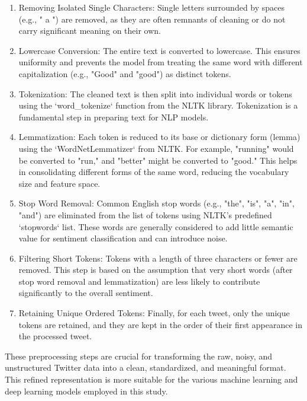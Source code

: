 \begin{enumerate}
    \item Removing Isolated Single Characters: Single letters surrounded by spaces (e.g., " a ") are removed, as they are often remnants of cleaning or do not carry significant meaning on their own.
    \item Lowercase Conversion: The entire text is converted to lowercase. This ensures uniformity and prevents the model from treating the same word with different capitalization (e.g., "Good" and "good") as distinct tokens.
    \item Tokenization: The cleaned text is then split into individual words or tokens using the `word\_tokenize` function from the NLTK library. Tokenization is a fundamental step in preparing text for NLP models.
    \item Lemmatization: Each token is reduced to its base or dictionary form (lemma) using the `WordNetLemmatizer` from NLTK. For example, "running" would be converted to "run," and "better" might be converted to "good." This helps in consolidating different forms of the same word, reducing the vocabulary size and feature space.
    \item Stop Word Removal: Common English stop words (e.g., "the", "is", "a", "in", "and") are eliminated from the list of tokens using NLTK's predefined `stopwords` list. These words are generally considered to add little semantic value for sentiment classification and can introduce noise.
    \item Filtering Short Tokens: Tokens with a length of three characters or fewer are removed. This step is based on the assumption that very short words (after stop word removal and lemmatization) are less likely to contribute significantly to the overall sentiment.
    \item Retaining Unique Ordered Tokens: Finally, for each tweet, only the unique tokens are retained, and they are kept in the order of their first appearance in the processed tweet.
\end{enumerate}

These preprocessing steps are crucial for transforming the raw, noisy, and unstructured Twitter data into a clean, standardized, and meaningful format. This refined representation is more suitable for the various machine learning and deep learning models employed in this study.